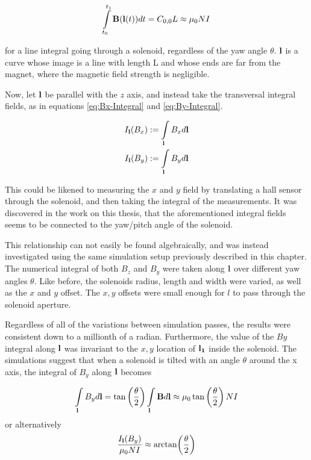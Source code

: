 \begin{equation}
    \int \limits_{t_0}^{t_1} \vb{B}(\vb{l}(t))dt = C_{0,0}L \approx \mu_0 NI
    \label{eq:Bzlineint}
\end{equation}

for a line integral going through a solenoid, regardless of the yaw
angle $\theta$. $\vb{l}$ is a curve whose image
is a line with length L and whose ends are far from the magnet, where
the magnetic field strength is negligible.

Now, let $\vb{l}$ be parallel with the $z$ axis, and instead take the
transversal integral fields, as in equations \ref{eq:Bx-Integral} and
\ref{eq:By-Integral}.

\begin{align}
    I_{\vb{l}}(B_x) & := \int \limits_{\vb{l}} B_x d\vb{l}
    \label{eq:Bx-Integral}                                 \\
    I_{\vb{l}}(B_y) & := \int \limits_{\vb{l}} B_y d\vb{l}
    \label{eq:By-Integral}
\end{align}

This could be
likened to measuring the $x$ and $y$ field by translating a hall sensor
through the solenoid, and then taking the integral of the measurements.
It was discovered in the work on this thesis, that the aforementioned
integral fields seems to be connected to the yaw/pitch angle of the
solenoid.

This relationship can not easily
be found algebraically, and was instead investigated using the same
simulation setup previously described in this chapter. The numerical integral of
both $B_z$ and $B_y$ were taken along $\vb{l}$ over different yaw angles $\theta$.
Like before, the solenoids
radius, length and width were varied, as well as the $x$ and $y$ offset.
The $x, y$ offsets were small enough
for $l$ to pass through the solenoid aperture.

Regardless of all of the variations between simulation passes, the results were
consistent down to a millionth of a radian.
Furthermore, the value of the $By$ integral along $\vb{l}$
was invariant to the $x,y$ location of $\vb{l_1}$ inside the solenoid.
The simulations suggest that when a solenoid is tilted with an angle $\theta$
around the x axis, the integral of $B_y$ along $\vb{l}$ becomes

\begin{equation}
    \int\limits_{\vb{l}}B_y d\vb{l} =
    \tan\left( \frac{\theta}{2} \right)  \int\limits_{\vb{l}}\vb{B} d\vb{l}
    \approx \mu_0\tan\left( \frac{\theta}{2} \right) NI
    \label{eq:tanhalf}
\end{equation}
or alternatively
\begin{equation}
    \frac{I_{\vb{l}}(B_y)}{\mu_0NI} \approx \arctan(\frac{\theta}{2})
    \label{eq:Byint-Error}
\end{equation}

